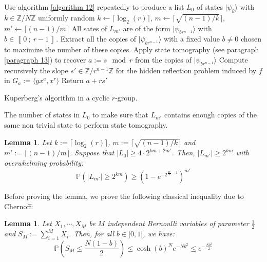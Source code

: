 \documentclass[a4paper,10pt]{report}
\theoremstyle{definition}
\theoremstyle{plain}
\newtheorem{lemma}[definition]{Lemma}
\theoremstyle{definition}
\newcommand{\Z}{\mathbb{Z}}
\renewcommand{\i}[2]{\left\llbracket #1~;~#2\right\rrbracket}
\renewcommand{\(}{\left(}
\renewcommand{\)}{\right)}
\renewcommand{\P}{\mathbb{P}}
\begin{document}
\begin{algorithm}\label{algorithm 14}
\SetAlgoLined
{}
\KwResult{$s\in\Z/N\Z$.}

Use algorithm \ref{algorithm 12} repeatedly to produce a list $L_0$ of states $|\psi_k\rangle$ with $k\in\Z/N\Z$ uniformly random\;
$k\leftarrow \lceil\log_2(r)\rceil$, $m\leftarrow \lceil \sqrt{(n-1)/k}\rceil$, $m'\leftarrow\lceil (n-1)/m\rceil$\;
All sates of $L_{m'}$ are of the form $|\psi_{br^{n-1}}\rangle$ with $b\in\i{0}{r-1}$. Extract all the copies of $|\psi_{br^{n-1}}\rangle$ with a fixed value $b\neq 0$ chosen to maximize the number of these copies. \;
Apply state tomography (see paragraph \ref{paragraph 13}) to recover $a:=s \mod r$ from the copies of $|\psi_{br^{n-1}}\rangle$\;
Compute recursively the slope $s'\in\Z/r^{n-1}\Z$ for the hidden reflection problem induced by $f$ in $G_a:=\langle yx^a,x^r\rangle$\;
Return $a+rs'$\;

\caption{Kuperberg's algorithm in a cyclic $r$-group.}
\end{algorithm}

The number of states in $L_0$ to make sure that $L_{m'}$ contains enough copies of the same non trivial state to perform state tomography.

\begin{lemma}\label{lemma 21}
Let $k:=\lceil\log_2(r)\rceil$, $m:=\lceil \sqrt{(n-1)/k}\rceil$ and $m':=\lceil (n-1)/m\rceil$. Suppose that $|L_0|\geq 4\cdot 2^{km+2m'}$. Then, $|L_{m'}|\geq 2^{km}$ with overwhelming probability: 
\[\P\(|L_{m'}|\geq 2^{km}\)\geq \(1-e^{-2^{\frac{m'}{3}-1}}\)^{m'}\]
\end{lemma}

Before proving the lemma, we prove the following classical inequality due to Chernoff:

\begin{lemma}
Let $X_1, \cdots, X_{M}$ be $M$ independent Bernoulli variables of parameter $\frac{1}{2}$ and $S_M:=\sum_{i=1}^M X_i$. Then, for all $b\in]0,1[$, we have:
\[\P\(S_M\leq\frac{N(1-b)}{2}\)\leq \cosh(b)^N e^{-Nb^2}\leq e^{-\frac{Nb^2}{2}}\]
\end{lemma}
\end{document}
